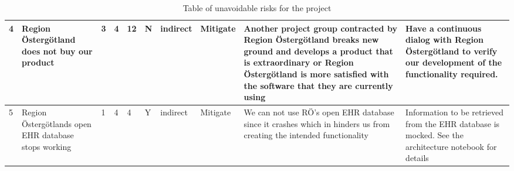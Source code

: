 \begin{table}[h!]
\begin{center}
\begin{tabular}{ | m{0.3cm} |m{2.8cm} |m{0.65cm} |m{0.6cm} |m{0.6cm} |m{0.6cm} |m{0.7cm} |m{0.6cm} |m{2.8cm} |m{2.8cm} | }
\hline


4 & Region Östergötland does not buy our product & 3 & 4 & \cellcolor{red!40}12 & N & indirect & Mitigate & Another project group contracted by Region Östergötland breaks new ground and develops a product that is extraordinary or Region Östergötland is more satisfied with the software that they are currently using & Have a continuous dialog with Region Östergötland to verify our development of the functionality required.\\
\hline
5 & Region Östergötlands open EHR database stops working & 1 & 4 & \cellcolor{green!40}4 & Y & indirect &  Mitigate & We can not use RÖ's open EHR database since it crashes which in hinders us from creating the intended functionality  & Information to be retrieved from the EHR database is mocked. See the architecture notebook for details \\
\hline


\end{tabular}

\end{center}
\caption{\label{tab:table-name}Table of unavoidable risks for the project}

\end{table}
